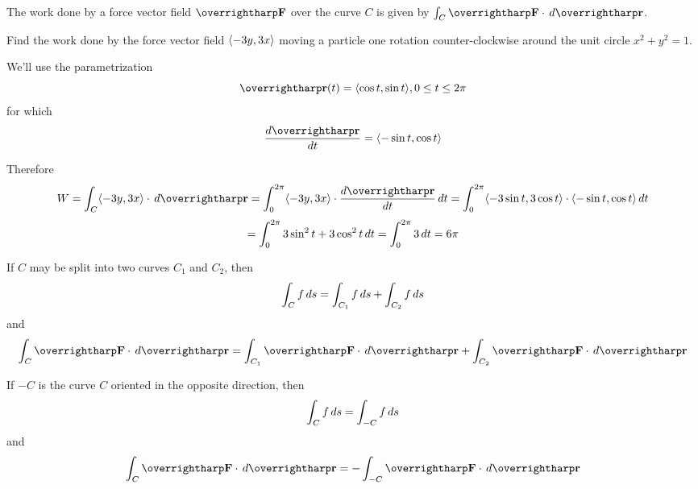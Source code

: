 \documentclass[letterpaper, twoside, 12pt]{book}
\begin{document}
\begin{remark}
  The work done by a force vector field $\vect{F}$ over the curve $C$
  is given by $\int_C\vect{F}\cdot\dvar{\vect{r}}$.
\end{remark}

          \begin{problem}
            Find the work done by the force vector field
            $\langle-3y,3x\rangle$ moving a particle one rotation counter-clockwise
            around the unit circle $x^2+y^2=1$.
          \end{problem}

          \begin{solution}
            We'll use the parametrization
              \[
                \vect{r}(t)
                  =
                \<\cos t,\sin t\>,
                0\leq t\leq 2\pi
              \]
            for which
              \[
                \frac{d\vect{r}}{dt}
                  =
                \<-\sin t,\cos t\>
              \]

            Therefore
              \[
                W
                  =
                \int_C \<-3y,3x\>\cdot\dvar{\vect{r}}
                  =
                \int_0^{2\pi} \<-3y,3x\>\cdot\frac{d\vect{r}}{dt}\dvar{t}
                  =
                \int_0^{2\pi}
                  \<-3\sin t,3\cos t\>\cdot\<-\sin t,\cos t\>
                \dvar{t}
              \]
              \[
                  =
                \int_0^{2\pi}
                  3\sin^2 t + 3\cos^2 t
                \,d{t}
                  =
                \int_0^{2\pi}
                  3
                \,d{t}
                  =
                6\pi
              \]
          \end{solution}

\begin{theorem}
  If $C$ may be split into two curves $C_1$ and $C_2$, then
  \[
    \int_C f\,d{s}
      =
    \int_{C_1} f\,d{s}
      +
    \int_{C_2} f\,d{s}
  \]
  and
  \[
    \int_C \vect F\cdot\dvar{\vect r}
      =
    \int_{C_1} \vect F\cdot\dvar{\vect r}
      +
    \int_{C_2} \vect F\cdot\dvar{\vect r}
  \]
\end{theorem}

\begin{theorem}
  If $-C$ is the curve $C$ oriented in the opposite direction, then
  \[
    \int_C f\,d{s}
      =
    \int_{-C} f\,d{s}
  \]
  and
  \[
    \int_C \vect F\cdot\dvar{\vect r}
      =
    - \int_{-C} \vect F\cdot\dvar{\vect r}
  \]
\end{theorem}
\end{document}
